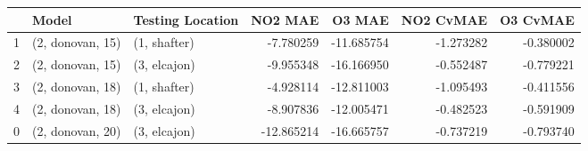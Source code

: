 \begin{tabular}{lllrrrr}
\toprule
{} &             Model & Testing Location &    NO2 MAE &     O3 MAE &  NO2 CvMAE &  O3 CvMAE \\
\midrule
1 &  (2, donovan, 15) &     (1, shafter) &  -7.780259 & -11.685754 &  -1.273282 & -0.380002 \\
2 &  (2, donovan, 15) &     (3, elcajon) &  -9.955348 & -16.166950 &  -0.552487 & -0.779221 \\
3 &  (2, donovan, 18) &     (1, shafter) &  -4.928114 & -12.811003 &  -1.095493 & -0.411556 \\
4 &  (2, donovan, 18) &     (3, elcajon) &  -8.907836 & -12.005471 &  -0.482523 & -0.591909 \\
0 &  (2, donovan, 20) &     (3, elcajon) & -12.865214 & -16.665757 &  -0.737219 & -0.793740 \\
\bottomrule
\end{tabular}
